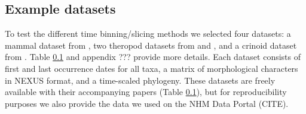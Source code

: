 \documentclass[12pt,a4paper]{article}
\begin{document}


\subsection{Example datasets}
\label{datasets}
To test the different time binning/slicing methods we selected four datasets: a mammal dataset from \cite{beckancient2014}, two theropod datasets from \cite{brusatte2014gradual} and \cite{bapst2016topology}, and a crinoid dataset from \cite{wright2017bayesian}.
Table \ref{datasets} and appendix ??? provide more details. %
Each dataset consists of first and last occurrence dates for all taxa, a matrix of morphological characters in NEXUS format, and a time-scaled phylogeny. 
These datasets are freely available with their accompanying papers (Table \ref{datasets}), but for reproducibility purposes we also provide the data we used on the NHM Data Portal (CITE).

     
    \label{tab:data}  
\end{document}
